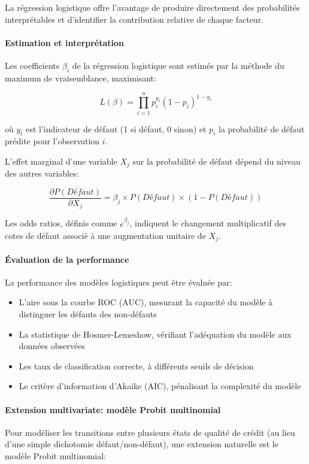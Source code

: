 La régression logistique offre l'avantage de produire directement des probabilités interprétables et d'identifier la contribution relative de chaque facteur.

\paragraph{Estimation et interprétation}
Les coefficients $\beta_i$ de la régression logistique sont estimés par la méthode du maximum de vraisemblance, maximisant:

\begin{equation}
L(\beta) = \prod_{i=1}^{n} p_i^{y_i} (1-p_i)^{1-y_i}
\end{equation}

où $y_i$ est l'indicateur de défaut (1 si défaut, 0 sinon) et $p_i$ la probabilité de défaut prédite pour l'observation $i$.

L'effet marginal d'une variable $X_j$ sur la probabilité de défaut dépend du niveau des autres variables:

\begin{equation}
\frac{\partial P(Défaut)}{\partial X_j} = \beta_j \times P(Défaut) \times (1 - P(Défaut))
\end{equation}

Les odds ratios, définis comme $e^{\beta_j}$, indiquent le changement multiplicatif des cotes de défaut associé à une augmentation unitaire de $X_j$.

\paragraph{Évaluation de la performance}
La performance des modèles logistiques peut être évaluée par:
\begin{itemize}
    \item L'aire sous la courbe ROC (AUC), mesurant la capacité du modèle à distinguer les défauts des non-défauts
    \item La statistique de Hosmer-Lemeshow, vérifiant l'adéquation du modèle aux données observées
    \item Les taux de classification correcte, à différents seuils de décision
    \item Le critère d'information d'Akaike (AIC), pénalisant la complexité du modèle
\end{itemize}

\paragraph{Extension multivariate: modèle Probit multinomial}
Pour modéliser les transitions entre plusieurs états de qualité de crédit (au lieu d'une simple dichotomie défaut/non-défaut), une extension naturelle est le modèle Probit multinomial:


